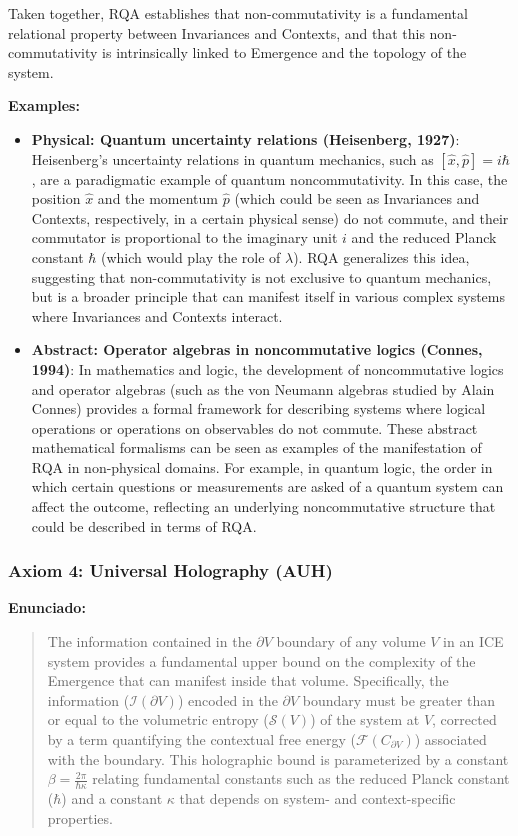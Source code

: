 \documentclass{article}
\begin{document}
Taken together, RQA establishes that non-commutativity is a fundamental relational property between Invariances and Contexts, and that this non-commutativity is intrinsically linked to Emergence and the topology of the system.

\textbf{Examples:}
\begin{itemize}
\item \textbf{Physical: Quantum uncertainty relations (Heisenberg, 1927)}: Heisenberg's uncertainty relations in quantum mechanics, such as $[\hat{x}, \hat{p}] = i\hbar$, are a paradigmatic example of quantum noncommutativity. In this case, the position $\hat{x}$ and the momentum $\hat{p}$ (which could be seen as Invariances and Contexts, respectively, in a certain physical sense) do not commute, and their commutator is proportional to the imaginary unit $i$ and the reduced Planck constant $\hbar$ (which would play the role of $\lambda$). RQA generalizes this idea, suggesting that non-commutativity is not exclusive to quantum mechanics, but is a broader principle that can manifest itself in various complex systems where Invariances and Contexts interact.

\item \textbf{Abstract: Operator algebras in noncommutative logics (Connes, 1994)}: In mathematics and logic, the development of noncommutative logics and operator algebras (such as the von Neumann algebras studied by Alain Connes) provides a formal framework for describing systems where logical operations or operations on observables do not commute. These abstract mathematical formalisms can be seen as examples of the manifestation of RQA in non-physical domains. For example, in quantum logic, the order in which certain questions or measurements are asked of a quantum system can affect the outcome, reflecting an underlying noncommutative structure that could be described in terms of RQA.
\end{itemize}

\subsubsection{Axiom 4: Universal Holography (AUH)}

\textbf{Enunciado:}
\begin{quote}
    The information contained in the $\partial V$ boundary of any volume $V$ in an ICE system provides a fundamental upper bound on the complexity of the Emergence that can manifest inside that volume. Specifically, the information ($\mathcal{I}(\partial V)$) encoded in the $\partial V$ boundary must be greater than or equal to the volumetric entropy ($\mathcal{S}(V)$) of the system at $V$, corrected by a term quantifying the contextual free energy ($\mathcal{F}(C_{\partial V})$) associated with the boundary. This holographic bound is parameterized by a constant $\beta = \frac{2\pi}{\hbar \kappa}$ relating fundamental constants such as the reduced Planck constant ($\hbar$) and a constant $\kappa$ that depends on system- and context-specific properties.
\end{quote}
\end{document}
